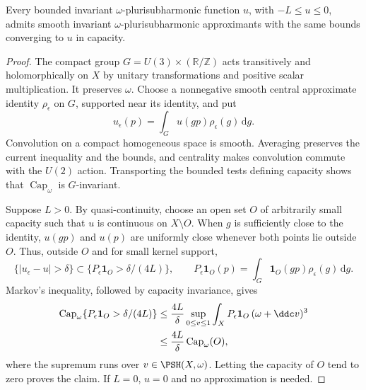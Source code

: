 \begin{lemma}\label{lem:rotational-capacity-smoothing}
Every bounded invariant $\omega$-plurisubharmonic function $u$, with $-L\leq u\leq0$, admits smooth invariant $\omega$-plurisubharmonic approximants with the same bounds converging to $u$ in capacity.
\end{lemma}
\begin{proof}
The compact group $G=U(3)\times(\mathbb R/\mathbb Z)$ acts transitively and holomorphically on $X$ by unitary transformations and positive scalar multiplication. It preserves $\omega$. Choose a nonnegative smooth central approximate identity $\rho_\epsilon$ on $G$, supported near its identity, and put
\[
 u_\epsilon(p)=\int_Gu(gp)\rho_\epsilon(g)\,\mathrm dg.
\]
Convolution on a compact homogeneous space is smooth. Averaging preserves the current inequality and the bounds, and centrality makes convolution commute with the $U(2)$ action. Transporting the bounded tests defining capacity shows that $\operatorname{Cap}_\omega$ is $G$-invariant.

Suppose $L>0$. By quasi-continuity, choose an open set $O$ of arbitrarily small capacity such that $u$ is continuous on $X\setminus O$. When $g$ is sufficiently close to the identity, $u(gp)$ and $u(p)$ are uniformly close whenever both points lie outside $O$. Thus, outside $O$ and for small kernel support,
\[
 \{|u_\epsilon-u|>\delta\}
 \subset\{P_\epsilon\mathbf1_O>\delta/(4L)\},\qquad
 P_\epsilon\mathbf1_O(p)=\int_G\mathbf1_O(gp)\rho_\epsilon(g)\,\mathrm dg.
\]
Markov's inequality, followed by capacity invariance, gives
\[
 \begin{split}
 \operatorname{Cap}_\omega\{P_\epsilon\mathbf1_O>\delta/(4L)\}
 &\leq\frac{4L}{\delta}\sup_{0\leq v\leq1}
       \int_XP_\epsilon\mathbf1_O\,(\omega+\ddc v)^3\\
 &\leq\frac{4L}{\delta}\operatorname{Cap}_\omega(O),
 \end{split}
\]
where the supremum runs over $v\in\PSH(X,\omega)$. Letting the capacity of $O$ tend to zero proves the claim. If $L=0$, $u=0$ and no approximation is needed.
\end{proof}

